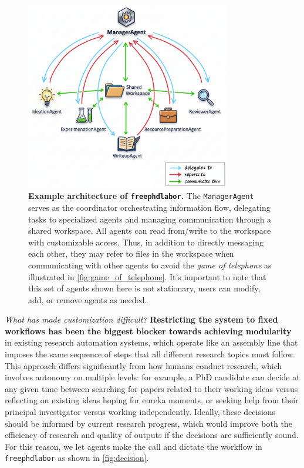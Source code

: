\documentclass{article}
\begin{document}
\begin{figure}[t]
\vskip 0.2in
\begin{center}
\centerline{\includegraphics[width=0.8\textwidth]{figures/architecture}}
\caption{\textbf{Example architecture of \texttt{freephdlabor}.} The \texttt{ManagerAgent} serves as the coordinator orchestrating information flow, delegating tasks to specialized agents and managing communication through a shared workspace. All agents can read from/write to the workspace with customizable access. Thus, in addition to directly messaging each other, they may refer to files in the workspace when communicating with other agents to avoid the \textit{game of telephone} as illustrated in \cref{fig:game_of_telephone}. It's important to note that this set of agents shown here is not stationary, users can modify, add, or remove agents as needed.}
\label{fig:architecture}
\end{center}
\vskip -0.2in
\end{figure}

\textit{What has made customization difficult?} \textbf{Restricting the system to fixed workflows has been the biggest blocker towards achieving modularity} in existing research automation systems, which operate like an assembly line that imposes the same sequence of steps that all different research topics must follow. This approach differs significantly from how humans conduct research, which involves autonomy on multiple levels: for example, a PhD candidate can decide at any given time between searching for papers related to their working ideas versus reflecting on existing ideas hoping for eureka moments, or seeking help from their principal investigator versus working independently. Ideally, these decisions should be informed by current research progress, which would improve both the efficiency of research and quality of outputs if the decisions are sufficiently sound. For this reason, we let agents make the call and dictate the workflow in \texttt{freephdlabor} as shown in \cref{fig:decision}.
\end{document}
